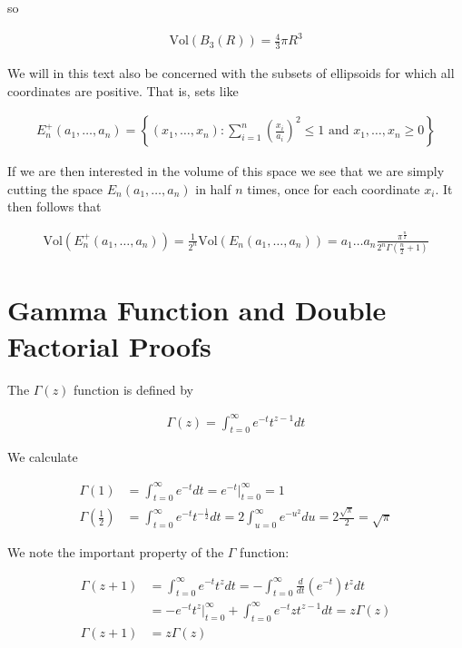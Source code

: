 \documentclass[12pt]{article}
\begin{document}
so 

\begin{align}
\text{Vol}(B_3(R)) = \frac{4}{3}\pi R^3
\end{align}

We will in this text also be concerned with the subsets of ellipsoids for which all coordinates are positive. That is, sets like

\begin{align}
E^+_n(a_1,\ldots,a_n) = \left\{(x_1,\ldots,x_n): \sum_{i=1}^n \left(\frac{x_i}{a_i}\right)^2 \le 1 \text{ and } x_1,\ldots,x_n\ge 0 \right\}
\end{align}

If we are then interested in the volume of this space we see that we are simply cutting the space $E_n(a_1,\ldots,a_n)$ in half $n$ times, once for each coordinate $x_i$. It then follows that

\begin{align}
\text{Vol}(E_n^+(a_1,\ldots,a_n)) = \frac{1}{2^n} \text{Vol}(E_n(a_1,\ldots, a_n)) = a_1\ldots a_n \frac{\pi^{\frac{n}{2}}}{2^n\Gamma\left(\frac{n}{2}+1\right)}
\end{align}

\section{Gamma Function and Double Factorial Proofs}

The $\Gamma(z)$ function is defined by

\begin{align}
\Gamma(z) = \int_{t=0}^{\infty} e^{-t}t^{z-1} dt
\end{align}

We calculate

\begin{align}
\Gamma(1) &= \int_{t=0}^{\infty} e^{-t} dt = e^{-t}\Big\rvert_{t=0}^{\infty} = 1\\
\Gamma\left(\frac{1}{2}\right) &= \int_{t=0}^{\infty} e^{-t} t^{-\frac{1}{2}} dt = 2\int_{u=0}^{\infty} e^{-u^2}du = 2\frac{\sqrt{\pi}}{2} = \sqrt{\pi}
\end{align}

We note the important property of the $\Gamma$ function:

\begin{align}
\Gamma(z+1) &= \int_{t=0}^{\infty} e^{-t}t^z dt = -\int_{t=0}^{\infty} \frac{d}{dt}\left(e^{-t}\right) t^z dt\\
&= -e^{-t}t^z\Big\rvert_{t=0}^{\infty} +\int_{t=0}^{\infty} e^{-t} zt^{z-1} dt = z \Gamma(z)\\
\Gamma(z+1) &= z \Gamma(z)
\end{align}
\end{document}
